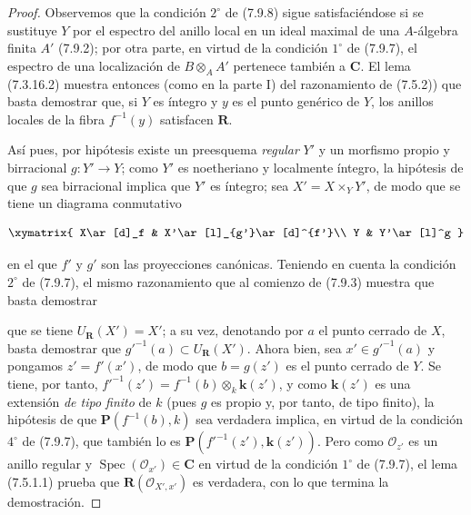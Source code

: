 \begin{proof}
Observemos que la condición $2^\circ$ de (7.9.8) sigue satisfaciéndose si
se sustituye $Y$ por el espectro del anillo local en un ideal maximal de una
$A$-álgebra finita $A'$ (7.9.2); por otra parte, en virtud de la condición
$1^\circ$ de (7.9.7), el espectro de una localización de
$B\otimes_AA'$ pertenece también a $\boldsymbol{C}$. El lema (7.3.16.2) muestra
entonces (como en la parte I) del razonamiento de (7.5.2)) que basta
demostrar que, si $Y$ es íntegro y $y$ es el punto genérico de $Y$, los
anillos locales de la fibra $f^{-1}(y)$ satisfacen $\boldsymbol R$.

Así pues, por hipótesis existe un preesquema \emph{regular} $Y'$ y un morfismo
propio y birracional $g:Y'\to Y$; como $Y'$ es noetheriano y localmente
íntegro, la hipótesis de que $g$ sea birracional implica que $Y'$ es íntegro;
sea $X'=X\times_YY'$, de modo que se tiene un diagrama conmutativo

\begin{env}[7.9.8.1]
\label{IV.2.s7.9.8.1-fr}
\[
\xymatrix{
X\ar[d]_f & X'\ar[l]_{g'}\ar[d]^{f'}\\
Y & Y'\ar[l]^g
}
\]
\end{env}

en el que $f'$ y $g'$ son las proyecciones canónicas. Teniendo en cuenta la condición
$2^\circ$ de (7.9.7), el mismo razonamiento que al comienzo de (7.9.3) muestra
que basta demostrar


que se tiene $U_{\mathbf{R}}(X')=X'$; a su vez, denotando por $a$ el punto
cerrado de $X$, basta demostrar que $g'^{-1}(a)\subset U_{\mathbf{R}}(X')$. Ahora bien, sea
$x'\in g'^{-1}(a)$ y pongamos $z'=f'(x')$, de modo que $b=g(z')$ es el
punto cerrado de $Y$. Se tiene, por tanto, $f'^{-1}(z')=f^{-1}(b)\otimes_k \boldsymbol{k}(z')$,
y como $\boldsymbol{k}(z')$ es una extensión \emph{de tipo finito} de $k$ (pues $g$ es
propio y, por tanto, de tipo finito), la hipótesis de que $\boldsymbol P(f^{-1}(b),k)$
sea verdadera implica, en virtud de la condición $4^\circ$ de (7.9.7), que también
lo es $\boldsymbol P(f'^{-1}(z'),\boldsymbol{k}(z'))$. Pero como
$\mathcal O_{z'}$ es un anillo regular y
$\operatorname{Spec}(\mathcal O_{x'})\in\boldsymbol{C}$ en virtud de la
condición $1^\circ$ de (7.9.7), el lema (7.5.1.1) prueba que
$\boldsymbol R(\mathcal O_{X',x'})$ es verdadera, con lo que termina la demostración.
\end{proof}
